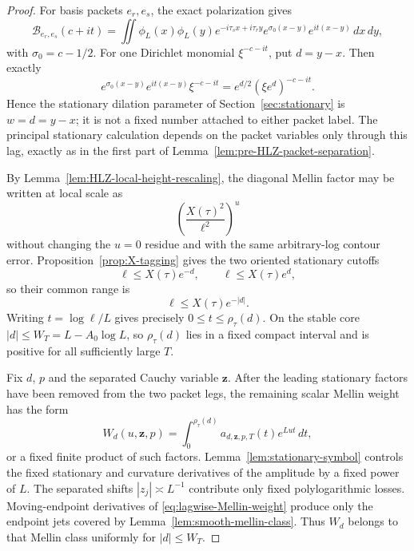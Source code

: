 \begin{proof}
For basis packets $e_r,e_s$, the exact polarization gives
\begin{equation}
\mathcal B_{e_r,e_s}(c+it)
=\iint\phi_L(x)\phi_L(y)e^{-i\tau_sx+i\tau_ry}
 e^{\sigma_0(x-y)}e^{it(x-y)}\,dx\,dy,
\label{eq:lagwise-polarization-recall}
\end{equation}
with $\sigma_0=c-1/2$.  For one Dirichlet monomial $\xi^{-c-it}$, put
$d=y-x$.  Then exactly
\[
e^{\sigma_0(x-y)}e^{it(x-y)}\xi^{-c-it}
=e^{d/2}(\xi e^d)^{-c-it}.
\]
Hence the stationary dilation parameter of Section~\ref{sec:stationary} is
$w=d=y-x$; it is not a fixed number attached to either packet label.
The principal stationary calculation depends on the packet variables only
through this lag, exactly as in the first part of
Lemma~\ref{lem:pre-HLZ-packet-separation}.

By Lemma~\ref{lem:HLZ-local-height-rescaling}, the diagonal Mellin factor may be
written at local scale as
\[
\left(\frac{X(\tau)^2}{\ell^2}\right)^u
\]
without changing the $u=0$ residue and with the same arbitrary-log contour
error.  Proposition~\ref{prop:X-tagging} gives the two oriented stationary
cutoffs
\[
\ell\le X(\tau)e^{-d},\qquad
\ell\le X(\tau)e^d,
\]
so their common range is
\begin{equation}
\boxed{
\ell\le X(\tau)e^{-|d|}.
}
\label{eq:lagwise-common-cutoff}
\end{equation}
Writing $t=\log\ell/L$ gives precisely
$0\le t\le\rho_\tau(d)$.  On the stable core
$|d|\le W_T=L-A_0\log L$, so $\rho_\tau(d)$ lies in a fixed compact interval
and is positive for all sufficiently large $T$.

Fix $d$, $p$ and the separated Cauchy variable $\mathbf z$.  After the leading
stationary factors have been removed from the two packet legs, the remaining
scalar Mellin weight has the form
\begin{equation}
W_d(u,\mathbf z,p)
=\int_0^{\rho_\tau(d)}
 a_{d,\mathbf z,p,T}(t)e^{Lut}\,dt,
\label{eq:lagwise-Mellin-weight}
\end{equation}
or a fixed finite product of such factors.  Lemma~\ref{lem:stationary-symbol}
controls the fixed stationary and curvature derivatives of the amplitude by a
fixed power of $L$.  The separated shifts $|z_j|\asymp L^{-1}$ contribute only
fixed polylogarithmic losses.  Moving-endpoint derivatives of
\eqref{eq:lagwise-Mellin-weight} produce only the endpoint jets covered by
Lemma~\ref{lem:smooth-mellin-class}.  Thus $W_d$ belongs to that Mellin class
uniformly for $|d|\le W_T$.


\end{proof}
